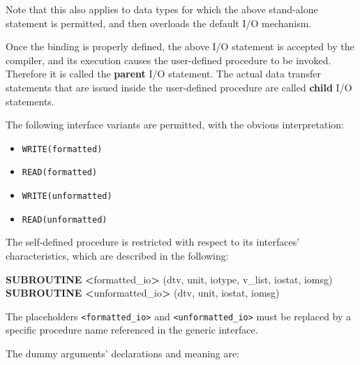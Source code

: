 \documentclass[
  paper=a4,
  ,captions=tableheading
]{scrartcl}
\newenvironment{Shaded}{\begin{snugshade}}{\end{snugshade}}
\newcommand{\KeywordTok}[1]{\textcolor[rgb]{0.13,0.29,0.53}{\textbf{#1}}}
\newcommand{\NormalTok}[1]{#1}
\newcommand{\OperatorTok}[1]{\textcolor[rgb]{0.81,0.36,0.00}{\textbf{#1}}}
\providecommand{\tightlist}{%
  \setlength{\itemsep}{0pt}\setlength{\parskip}{0pt}}
\begin{document}
Note that this also applies to data types for which the above
stand-alone statement is permitted, and then overloads the default I/O
mechanism.

Once the binding is properly defined, the above I/O statement is
accepted by the compiler, and its execution causes the user-defined
procedure to be invoked. Therefore it is called the \textbf{parent} I/O
statement. The actual data transfer statements that are issued inside
the user-defined procedure are called \textbf{child} I/O statements.

The following interface variants are permitted, with the obvious
interpretation:

\begin{itemize}
\tightlist
\item
  \texttt{WRITE(formatted)}
\item
  \texttt{READ(formatted)}
\item
  \texttt{WRITE(unformatted)}
\item
  \texttt{READ(unformatted)}
\end{itemize}

The self-defined procedure is restricted with respect to its interfaces'
characteristics, which are described in the following:

\begin{Shaded}
\begin{Highlighting}[]
\KeywordTok{SUBROUTINE} \OperatorTok{\textless{}}\NormalTok{formatted\_io}\OperatorTok{\textgreater{}}\NormalTok{   (dtv, unit, iotype, v\_list, iostat, iomsg)}
\KeywordTok{SUBROUTINE} \OperatorTok{\textless{}}\NormalTok{unformatted\_io}\OperatorTok{\textgreater{}}\NormalTok{ (dtv, unit,                 iostat, iomsg)}
\end{Highlighting}
\end{Shaded}

The placeholders \texttt{\textless{}formatted\_io\textgreater{}} and
\texttt{\textless{}unformatted\_io\textgreater{}} must be replaced by a
specific procedure name referenced in the generic interface.

The dummy arguments' declarations and meaning are:
\end{document}
